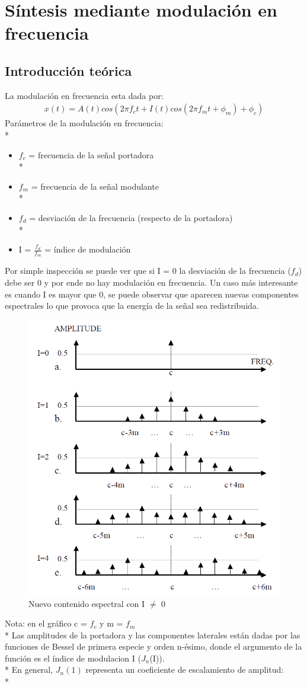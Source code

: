 \documentclass[assd_tp2_main.tex]{subfiles}
\begin{document}
\section{Síntesis mediante modulación en frecuencia}
\subsection*{Introducción teórica}
La modulación en frecuencia esta dada por:
\begin{eqnarray*}
\textstyle x(t)=A(t)cos(2\pi f_c t+I(t)cos(2\pi f_mt+\phi_m)+\phi_c)
\end{eqnarray*}
Parámetros de la modulación en frecuencia:\\*
\begin{itemize}
\item $f_c$ = frecuencia de la señal portadora\\*
\item $f_m$ = frecuencia de la señal modulante\\*
\item $f_d$ = desviación de la frecuencia (respecto de la portadora)\\*
\item I = $\displaystyle \frac{f_d}{f_m}$ = índice de modulación
\end{itemize}

Por simple inspección se puede ver que si I = 0 la desviación de la frecuencia ($f_d$) debe ser 0 y por ende no hay  modulación en frecuencia. Un caso más interesante es cuando I es mayor que 0, se puede observar que aparecen nuevas componentes espectrales lo que provoca que la energía de la señal sea redistribuida.  
\begin{figure}[H]
\centering
\includegraphics[width=0.4\linewidth]{graficos/EJ4/nuevasfreqs.png}
\caption{Nuevo contenido espectral con I $\neq$ 0}
\label{fig:nuevasfreqs}
\end{figure}
Nota: en el gráfico c = $f_c$ y  m = $f_m$ \\*
Las amplitudes de la portadora y las componentes laterales están dadas por las funciones de Bessel de primera especie y orden n-ésimo,
donde el argumento de la función es el índice de modulacion I ($J_{n}$(I)). \\*
En general, $J_{n}(1)$ representa un coeficiente de escalamiento de amplitud: \\*
\end{document}
